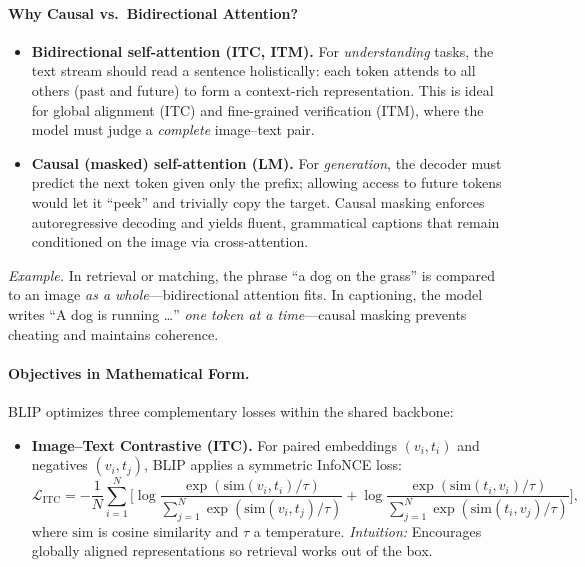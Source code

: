 \begin{enrichment}
\begin{enrichment}
        \paragraph{Why Causal vs.\ Bidirectional Attention?}
        \begin{itemize}
            \item \textbf{Bidirectional self-attention (ITC, ITM).} For \emph{understanding} tasks, the text stream should read a sentence holistically: each token attends to all others (past and future) to form a context-rich representation. This is ideal for global alignment (ITC) and fine-grained verification (ITM), where the model must judge a \emph{complete} image–text pair.
            \item \textbf{Causal (masked) self-attention (LM).} For \emph{generation}, the decoder must predict the next token given only the prefix; allowing access to future tokens would let it “peek” and trivially copy the target. Causal masking enforces autoregressive decoding and yields fluent, grammatical captions that remain conditioned on the image via cross-attention.
        \end{itemize}
        \emph{Example.} In retrieval or matching, the phrase “a dog on the grass” is compared to an image \emph{as a whole}—bidirectional attention fits. In captioning, the model writes “A dog is running \dots” \emph{one token at a time}—causal masking prevents cheating and maintains coherence.
        
        \paragraph{Objectives in Mathematical Form.}
        BLIP optimizes three complementary losses within the shared backbone:
        \begin{itemize}
            \item \textbf{Image--Text Contrastive (ITC).}  
            For paired embeddings $(v_i, t_i)$ and negatives $(v_i, t_j)$, BLIP applies a symmetric InfoNCE loss:  
            \[
            \mathcal{L}_{\mathrm{ITC}} = -\frac{1}{N} \sum_{i=1}^N 
            \Big[ \log \frac{\exp(\mathrm{sim}(v_i,t_i)/\tau)}{\sum_{j=1}^N \exp(\mathrm{sim}(v_i,t_j)/\tau)}
            + \log \frac{\exp(\mathrm{sim}(t_i,v_i)/\tau)}{\sum_{j=1}^N \exp(\mathrm{sim}(t_i,v_j)/\tau)} \Big],
            \]
            where $\mathrm{sim}$ is cosine similarity and $\tau$ a temperature.  
            \emph{Intuition:} Encourages globally aligned representations so retrieval works out of the box.
            

\end{itemize}
\end{enrichment}
\end{enrichment}
